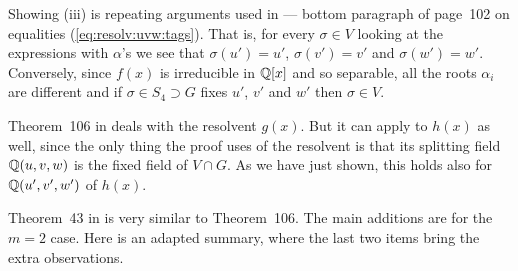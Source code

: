 Showing (iii) is repeating arguments used
in \cite{Rotman98} --- bottom paragraph of page~102
on equalities (\ref{eq:resolv:uvw:tags}).
That is, for every \(\sigma\in V\)
looking at the expressions with \(\alpha\)'s we see that
\(\sigma(u') = u'\),
\(\sigma(v') = v'\) and
\(\sigma(w') = w'\).
Conversely, since \(f(x)\) is irreducible in \(\mathbb{Q}[x]\)
and so separable, all the roots \(\alpha_i\) are different
and if \(\sigma\in S_4\supset G\) fixes $u'$, $v'$ and $w'$
then \(\sigma\in V\).
\proofend

Theorem~106 in \cite{Rotman98} deals with the resolvent \(g(x)\).
But it can apply to \(h(x)\) as well, since
the only thing the proof uses of the resolvent is that
its splitting field \(\mathbb{Q}(u,v,w)\) is the fixed field of \(V\cap G\).
As we have just shown, this holds also for \(\mathbb{Q}(u',v',w')\) of \(h(x)\).

Theorem~43 in \cite{Kap74} is very similar to Theorem~106.
The main additions are for the \(m=2\) case.
Here is an adapted summary, where 
the last two items bring the extra observations.

